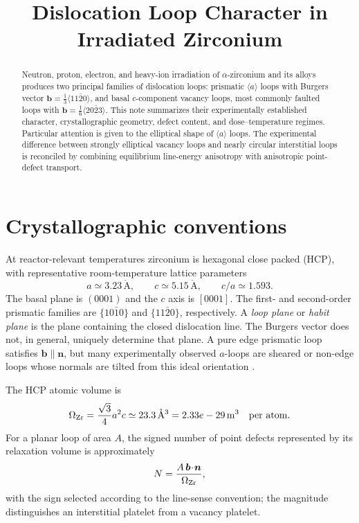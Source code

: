 \documentclass[11pt]{article}
\title{Dislocation Loop Character in Irradiated Zirconium}
\author{}
\date{}
\newcommand{\bvec}{\bm b}
\newcommand{\nvec}{\bm n}
\newcommand{\SI}[2]{\ensuremath{#1\,#2}}
\newcommand{\angstrom}{\mathring{\mathrm A}}
\newcommand{\meter}{\mathrm{m}}
\begin{document}
\maketitle

\begin{abstract}
Neutron, proton, electron, and heavy-ion irradiation of $\alpha$-zirconium and its alloys produces two principal families of dislocation loops: prismatic $\langle a\rangle$ loops with Burgers vector $\bvec=\tfrac13\langle11\bar20\rangle$, and basal $c$-component vacancy loops, most commonly faulted loops with $\bvec=\tfrac16\langle20\bar23\rangle$. This note summarizes their experimentally established character, crystallographic geometry, defect content, and dose--temperature regimes. Particular attention is given to the elliptical shape of $\langle a\rangle$ loops. The experimental difference between strongly elliptical vacancy loops and nearly circular interstitial loops is reconciled by combining equilibrium line-energy anisotropy with anisotropic point-defect transport.
\end{abstract}

\section{Crystallographic conventions}

At reactor-relevant temperatures zirconium is hexagonal close packed (HCP), with representative room-temperature lattice parameters
\begin{equation}
 a\simeq \SI{3.23}{\angstrom},\qquad c\simeq \SI{5.15}{\angstrom},
 \qquad c/a\simeq1.593.
\end{equation}
The basal plane is $(0001)$ and the $c$ axis is $[0001]$. The first- and second-order prismatic families are $\{10\bar10\}$ and $\{11\bar20\}$, respectively. A \emph{loop plane} or \emph{habit plane} is the plane containing the closed dislocation line. The Burgers vector does not, in general, uniquely determine that plane. A pure edge prismatic loop satisfies $\bvec\parallel\nvec$, but many experimentally observed $a$-loops are sheared or non-edge loops whose normals are tilted from this ideal orientation \citep{Jostsons1977Nature,Northwood1979RoundRobin}.

The HCP atomic volume is
\begin{equation}
 \Omega_{\rm Zr}=\frac{\sqrt3}{4}a^2c\simeq
 \SI{23.3}{\angstrom^3}=\SI{2.33e-29}{\meter^3}\quad\text{per atom}.
 \label{eq:atomic-volume}
\end{equation}
For a planar loop of area $A$, the signed number of point defects represented by its relaxation volume is approximately
\begin{equation}
 N=\frac{A\,\bvec\!\cdot\!\nvec}{\Omega_{\rm Zr}},
 \label{eq:defect-number}
\end{equation}
with the sign selected according to the line-sense convention; the magnitude distinguishes an interstitial platelet from a vacancy platelet.
\end{document}

